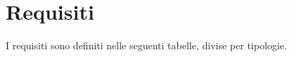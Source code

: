 \section{Requisiti}
I requisiti sono definiti nelle seguenti tabelle, divise per tipologie.
\begin{comment}
				\begin{itemize}
					\item \textbf{codice identificativo}: è un codice univoco e conforme alla codifica: \\ \\
					\centerline{\textbf{Re[Importanza][Tipologia][Codice]}} \\ \\
					Le voci riportate nella precedente codifica significano: 
					\begin{itemize}
						\item \textbf{Importanza}: la quale può assumere come valori:
						\begin{itemize}
							\item 1: requisito obbligatorio, irrinunciabile;
							\item 2: requisito desiderabile, perciò non obbligatorio ma riconoscibile;
							\item 3: requisito opzionale, ovvero trattabile in un secondo momento o relativamente utile.
						\end{itemize}
						\item \textbf{Tipologia}: la quale può assumere come valori:
						\begin{itemize}
							\item F: funzionale;
							\item P: prestazionale;
							\item Q: qualitativo;
							\item V: vincolo.
						\end{itemize}
						\item \textbf{Codice identificativo}: il quale è un identificatore univoco del requisito, e viene espresso in forma gerarchica padre/figlio.
					\end{itemize}
					\item \textbf{Classificazione}: specifica il peso del requisito facilitando la sua lettura anche se causa ridondanza;
					\item \textbf{Descrizione}: sintesi completa di un requisito;
					\item \textbf{Fonti}: il requisito può avere le seguenti provenienze:
					\begin{itemize}

\end{comment}
